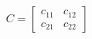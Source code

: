 \documentclass[preview]{standalone}
\begin{document}
\begin{align*}
C = \begin{bmatrix} c_{11} & c_{12} \\ c_{21} & c_{22} \end{bmatrix}
\end{align*}
\end{document}
